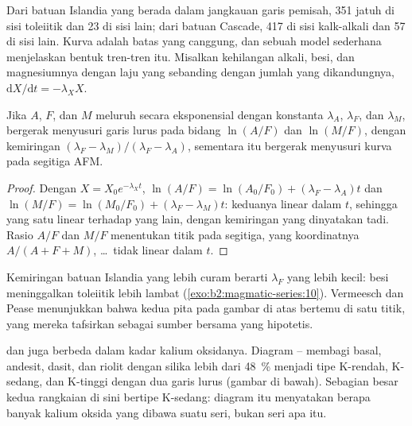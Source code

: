 Dari batuan Islandia yang berada dalam jangkauan garis pemisah, 351 jatuh di sisi
toleiitik dan 23 di sisi lain; dari batuan Cascade, 417 di sisi kalk-alkali
dan 57 di sisi lain. Kurva adalah batas yang canggung, dan sebuah model sederhana menjelaskan
bentuk tren-tren itu. Misalkan  kehilangan alkali, besi, dan magnesiumnya
dengan laju yang sebanding dengan jumlah yang dikandungnya, $\mathrm dX/\mathrm dt = -\lambda_X X$.

\begin{proposition}\label{prop:b2:magmatic-series:logratio}
Jika $A$, $F$, dan $M$ meluruh secara eksponensial dengan konstanta $\lambda_A$, $\lambda_F$, dan
$\lambda_M$,  bergerak menyusuri garis lurus pada bidang $\ln(A/F)$ dan
$\ln(M/F)$, dengan kemiringan $(\lambda_F - \lambda_M)/(\lambda_F - \lambda_A)$, sementara  itu bergerak
menyusuri kurva pada segitiga AFM.
\end{proposition}

\begin{proof}
Dengan $X = X_0 e^{-\lambda_X t}$, $\ln(A/F) = \ln(A_0/F_0) + (\lambda_F - \lambda_A)t$
dan $\ln(M/F) = \ln(M_0/F_0) + (\lambda_F - \lambda_M)t$: keduanya linear dalam $t$, sehingga
yang satu linear terhadap yang lain, dengan kemiringan yang dinyatakan tadi. Rasio $A/F$ dan $M/F$ menentukan
titik pada segitiga, yang koordinatnya $A/(A + F + M)$, \dots\ tidak linear dalam $t$.
\end{proof}

Kemiringan batuan Islandia yang lebih curam berarti $\lambda_F$ yang lebih kecil: besi meninggalkan
 toleiitik lebih lambat (\cref{exo:b2:magmatic-series:10}). Vermeesch dan Pease menunjukkan bahwa kedua
pita pada gambar di atas bertemu di satu titik, yang mereka tafsirkan sebagai sumber bersama
yang hipotetis.

 dan  juga berbeda dalam kadar kalium oksidanya. Diagram
-- membagi basal, andesit, dasit, dan riolit dengan
silika lebih dari \qty{48}{\percent} menjadi tipe K-rendah, K-sedang, dan K-tinggi dengan dua
garis lurus (gambar di bawah). Sebagian besar kedua rangkaian di sini bertipe K-sedang:
diagram itu menyatakan berapa banyak kalium oksida yang dibawa suatu seri, bukan seri apa itu.

